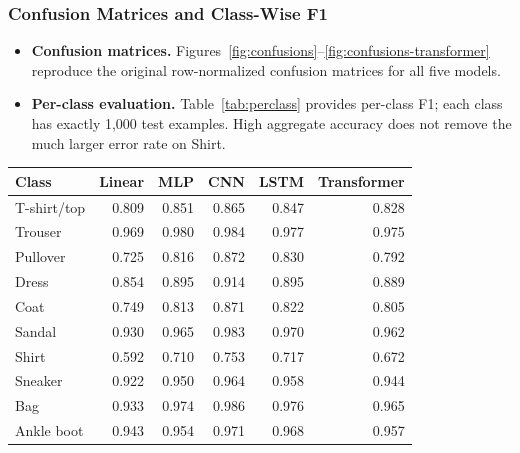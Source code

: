 \subsubsection{Confusion Matrices and Class-Wise F1}
\begin{itemize}
\setlength{\itemsep}{3pt}
\setlength{\parskip}{0pt}
\item \textbf{Confusion matrices.} Figures~\ref{fig:confusions}--\ref{fig:confusions-transformer} reproduce the original row-normalized confusion matrices for all five models.
\item \textbf{Per-class evaluation.} Table~\ref{tab:perclass} provides per-class F1; each class has exactly 1,000 test examples. High aggregate accuracy does not remove the much larger error rate on Shirt.
\end{itemize}
\par\medskip\noindent\begin{minipage}{\linewidth}\centering\small
{}
\label{tab:perclass}
\begin{tabular}{@{}lrrrrr@{}}\toprule
Class & Linear & MLP & CNN & LSTM & Transformer\\\midrule
T-shirt/top & 0.809 & 0.851 & 0.865 & 0.847 & 0.828\\
Trouser & 0.969 & 0.980 & 0.984 & 0.977 & 0.975\\
Pullover & 0.725 & 0.816 & 0.872 & 0.830 & 0.792\\
Dress & 0.854 & 0.895 & 0.914 & 0.895 & 0.889\\
Coat & 0.749 & 0.813 & 0.871 & 0.822 & 0.805\\
Sandal & 0.930 & 0.965 & 0.983 & 0.970 & 0.962\\
Shirt & 0.592 & 0.710 & 0.753 & 0.717 & 0.672\\
Sneaker & 0.922 & 0.950 & 0.964 & 0.958 & 0.944\\
Bag & 0.933 & 0.974 & 0.986 & 0.976 & 0.965\\
Ankle boot & 0.943 & 0.954 & 0.971 & 0.968 & 0.957\\
\bottomrule\end{tabular}\end{minipage}\par\medskip

